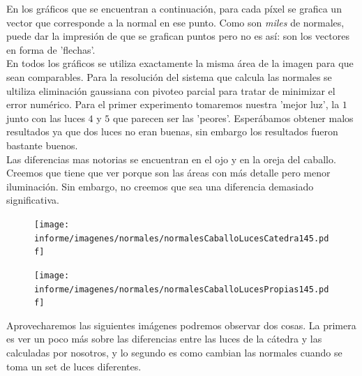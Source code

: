En los gráficos que se encuentran a continuación, para cada píxel se grafica un vector que corresponde a la normal en ese punto. Como son \textit{miles} de normales, puede dar la impresión de que se grafican puntos pero no es así: son los vectores en forma de 'flechas'. \\

En todos los gráficos se utiliza exactamente la misma área de la imagen para que sean comparables. Para la resolución del sistema que calcula las normales se ultiliza eliminación gaussiana con pivoteo parcial para tratar de minimizar el error numérico. Para el primer experimento tomaremos nuestra 'mejor luz', la $1$ junto con las luces $4$ y $5$ que parecen ser las 'peores'. Esperábamos obtener malos resultados ya que dos luces no eran buenas, sin embargo los resultados fueron bastante buenos. \\

Las diferencias mas notorias se encuentran en el ojo y en la oreja del caballo. Creemos que tiene que ver porque son las áreas con más detalle pero menor iluminación. Sin embargo, no creemos que sea una diferencia demasiado significativa.



\begin{figure}[H]
\centering
\begin{minipage}{.5\textwidth}
    \centering
        \texttt{[image: informe/imagenes/normales/normalesCaballoLucesCatedra145.pdf]}
\end{minipage}%
\begin{minipage}{.5\textwidth}
    \centering
        \texttt{[image: informe/imagenes/normales/normalesCaballoLucesPropias145.pdf]} \\
\end{minipage}
\end{figure}

Aprovecharemos las siguientes imágenes podremos observar dos cosas. La primera es ver un poco más sobre las diferencias entre las luces de la cátedra y las calculadas por nosotros, y lo segundo es como cambian las normales cuando se toma un set de luces diferentes. \\


